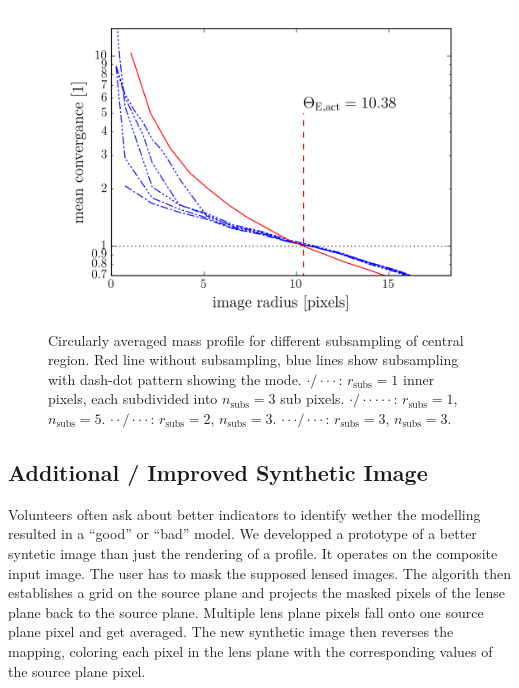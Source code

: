 \documentclass[fleqn,usenatbib]{mnras}
\begin{document}
\begin{figure}
  \includegraphics[width=\linewidth]{hires/007022_kappa_encl}
  \caption{
    Circularly averaged mass profile for different subsampling of central region.
    Red line without subsampling, blue lines show subsampling with dash-dot pattern showing the mode.
    $\cdot / \cdot \cdot \cdot$: $r_\text{subs}=1$ inner pixels, each subdivided into $n_\text{subs}=3$ sub pixels.
    $\cdot / \cdot \cdot \cdot \cdot \cdot$: $r_\text{subs}=1$, $n_\text{subs}=5$.
    $\cdot \cdot / \cdot \cdot \cdot $: $r_\text{subs}=2$, $n_\text{subs}=3$.
    $\cdot \cdot \cdot / \cdot \cdot \cdot $: $r_\text{subs}=3$, $n_\text{subs}=3$.
    }
  \label{fig:subsampling}
\end{figure}




\subsection{Additional / Improved Synthetic Image}

Volunteers often ask about better indicators to identify wether the modelling resulted in a ``good'' or ``bad'' model.
We developped a prototype of a better syntetic image than just the rendering of a  profile.
It operates on the composite input image.
The user has to mask the supposed lensed images.
The algorith then establishes a grid on the source plane and projects the masked pixels of the lense plane back to the source plane.
Multiple lens plane pixels fall onto one source plane pixel and get averaged.
The new synthetic image then reverses the mapping, coloring each pixel in the lens plane with the corresponding values of the source plane pixel.
\end{document}
